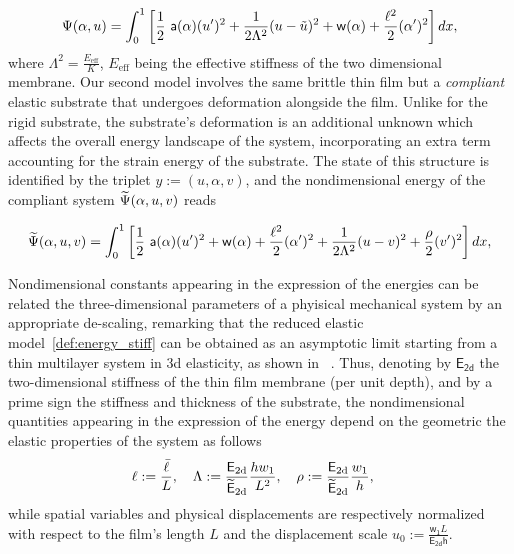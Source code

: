\begin{equation}
    \label{def:energy_stiff}
    \Psi(\alpha, u) = \int_{0}^{1} \left[ \frac{1}{2} \ \soften(\alpha)(u')^2 
    + \frac{1}{2 \elastell^2} (u-\subsu)^2
    + \homogdiss(\alpha) + \frac{\damagell^2}{2}(\alpha')^2 
     \right] dx,
\end{equation}
where $\Lambda^2 = \frac{E_{\text{eff}}}{K}$, $E_{\text{eff}}$ being the effective stiffness of the two dimensional membrane.
Our second model involves the same brittle thin film but a \emph{compliant} elastic substrate that undergoes deformation alongside the film. Unlike for the rigid substrate, the substrate's deformation is an additional unknown which affects the overall energy landscape of the system, incorporating an extra term accounting for the strain energy of the substrate. 
The state of this structure is identified by the triplet $y:=(u, \alpha, v)$, and the nondimensional energy of the compliant system  $\widetilde\Psi(\alpha, u, v)$ reads

\begin{equation}
    \label{def:energy_compliant}
    \Ecompl(\alpha, u,  v) = \int_{0}^1 \left[ \frac{1}{2} \ \soften(\alpha)(u')^2 + \homogdiss(\alpha) + \frac{\damagell^2}{2}(\alpha')^2 
    + \frac{1}{2 \elastell^2} (u- v)^2 
    + \frac{\stiffratio}{2}  (v')^2 \right] dx,
\end{equation}



Nondimensional constants appearing in the expression of the energies can be related the three-dimensional parameters of a phyisical mechanical system by an appropriate de-scaling, remarking that the reduced elastic model~\eqref{def:energy_stiff} can be obtained as an asymptotic limit starting from a thin multilayer system in 3d elasticity, as shown in~\cite{Leon_Baldelli2015-rp} .
Thus, denoting by $\mathsf{E_\text{2d}}$ the two-dimensional stiffness of the thin film membrane (per unit depth), and by a prime sign the stiffness and thickness of the substrate, the nondimensional quantities appearing in the expression of the energy depend on the geometric the elastic properties of the system as follows
\begin{equation}
    \label{def:dimensional_parameters}
    \ell := \frac{\bar{\ell}}{L}, \quad
    \Lambda := \frac{\mathsf{E_{\text{2d}}}}{{\mathsf{\widetilde E_{\text{2d}}}}}\frac{h w_1}{L^2}, \quad
    \rho := \frac{\mathsf{E_{\text{2d}}}}{{\mathsf{\widetilde E_{\text{2d}}}}}\frac{w_1}{h}, \quad
\end{equation}
while spatial variables and physical displacements are respectively normalized with respect to the film's length $L$ and the displacement scale $u_0 := \frac{\mathsf{w_1}L}{\mathsf{E_{\text{2d}} h}}$.




